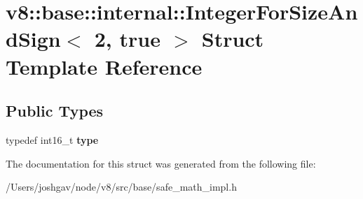\hypertarget{structv8_1_1base_1_1internal_1_1_integer_for_size_and_sign_3_012_00_01true_01_4}{}\section{v8\+:\+:base\+:\+:internal\+:\+:Integer\+For\+Size\+And\+Sign$<$ 2, true $>$ Struct Template Reference}
\label{structv8_1_1base_1_1internal_1_1_integer_for_size_and_sign_3_012_00_01true_01_4}
\subsection*{Public Types}
\begin{DoxyCompactItemize}
\item 
typedef int16\+\_\+t {\bfseries type}\hypertarget{structv8_1_1base_1_1internal_1_1_integer_for_size_and_sign_3_012_00_01true_01_4_af73b142b41d74ad4c0068dc490c862a4}{}\label{structv8_1_1base_1_1internal_1_1_integer_for_size_and_sign_3_012_00_01true_01_4_af73b142b41d74ad4c0068dc490c862a4}

\end{DoxyCompactItemize}


The documentation for this struct was generated from the following file\+:\begin{DoxyCompactItemize}
\item 
/\+Users/joshgav/node/v8/src/base/safe\+\_\+math\+\_\+impl.\+h\end{DoxyCompactItemize}
